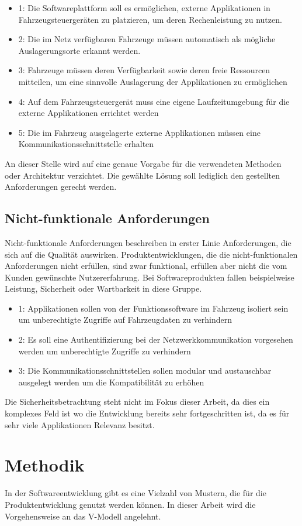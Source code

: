 \begin{itemize}
    \item 1: Die Softwareplattform soll es ermöglichen, externe Applikationen in Fahrzeugsteuergeräten zu platzieren, um deren Rechenleistung zu nutzen.
    \item 2: Die im Netz verfügbaren Fahrzeuge müssen automatisch als mögliche Auslagerungsorte erkannt werden.
    \item 3: Fahrzeuge müssen deren Verfügbarkeit sowie deren freie Ressourcen mitteilen, um eine sinnvolle Auslagerung der Applikationen zu ermöglichen
    \item 4: Auf dem Fahrzeugsteuergerät muss eine eigene Laufzeitumgebung für die externe Applikationen errichtet werden
    \item 5: Die im Fahrzeug ausgelagerte externe Applikationen müssen eine Kommunikationsschnittstelle erhalten
\end{itemize}

An dieser Stelle wird auf eine genaue Vorgabe für die verwendeten Methoden oder Architektur verzichtet. Die gewählte Lösung soll lediglich den gestellten Anforderungen gerecht werden. 

\subsection{Nicht-funktionale Anforderungen}

Nicht-funktionale Anforderungen beschreiben in erster Linie Anforderungen, die sich auf die Qualität auswirken. Produktentwicklungen, die die nicht-funktionalen Anforderungen nicht erfüllen, sind zwar funktional, erfüllen aber nicht die vom Kunden gewünschte Nutzererfahrung. Bei Softwareprodukten fallen beispielweise Leistung, Sicherheit oder Wartbarkeit in diese Gruppe. 

\begin{itemize}
    \item 1: Applikationen sollen von der Funktionssoftware im Fahrzeug isoliert sein um unberechtigte Zugriffe auf Fahrzeugdaten zu verhindern
    \item 2: Es soll eine Authentifizierung bei der Netzwerkkommunikation vorgesehen werden um unberechtigte Zugriffe zu verhindern
    \item 3: Die Kommunikationsschnittstellen sollen modular und austauschbar ausgelegt werden um die Kompatibilität zu erhöhen
\end{itemize}

Die Sicherheitsbetrachtung steht nicht im Fokus dieser Arbeit, da dies ein komplexes Feld ist wo die Entwicklung bereits sehr fortgeschritten ist, da es für sehr viele Applikationen Relevanz besitzt. 

\section{Methodik}

In der Softwareentwicklung gibt es eine Vielzahl von Mustern, die für die Produktentwicklung genutzt werden können. \cite{Bass2012} In dieser Arbeit wird die Vorgehensweise an das V-Modell angelehnt. 